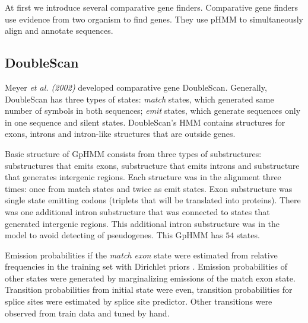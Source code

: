 

At first we introduce several comparative gene finders. Comparative gene finders
use evidence from two organism to find genes. They use pHMM to simultaneously  
align and annotate sequences. 

\subsection{DoubleScan}
Meyer {\it et al. (2002)} developed comparative gene DoubleScan.
Generally, DoubleScan has three types of
states: {\it match} states, which generated same number of symbols in both
sequences;   {\it emit} states, which generate sequences only in one sequence
and silent states. DoubleScan's HMM contains structures for exons, introns and
intron-like structures that are outside genes. 

Basic structure of GpHMM consists from three types of substructures:
substructures that emits exons, substructure that emits introns and substructure
that generates intergenic regions. Each structure was in the alignment three
times: once from match states and twice as emit states. Exon substructure was
single state emitting codons (triplets that will be translated into proteins).
There was one additional intron substructure that was connected to states that
generated intergenic regions. This additional intron substructure was in the
model to avoid detecting of pseudogenes. This GpHMM has $54$ states.

\nocite{Meyer2002}

Emission probabilities if the {\it match exon} state were estimated from
relative frequencies in the training set with Dirichlet priors
\cite{Meyer2002,Durbin1998}.  Emission probabilities of other states were
generated  by marginalizing emissions of the match exon state. Transition
probabilities from initial state were even, transition probabilities for splice
sites were estimated by splice site predictor. Other transitions were observed
from train data and tuned by hand.


